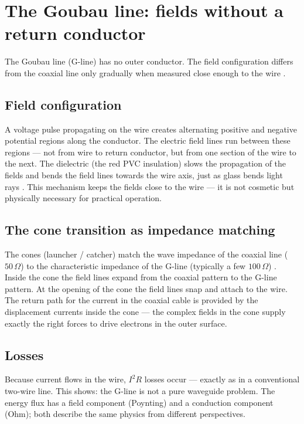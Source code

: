 \section{The Goubau line: fields without a return conductor}

The Goubau line (G-line) has no outer conductor. The field configuration
differs from the coaxial line only gradually when measured close enough to
the wire \EM.

\subsection*{Field configuration}

A voltage pulse propagating on the wire creates alternating positive and
negative potential regions along the conductor. The electric field lines
run between these regions --- not from wire to return conductor, but from
one section of the wire to the next. The dielectric (the red PVC insulation)
slows the propagation of the fields and bends the field lines towards the
wire axis, just as glass bends light rays \cite{Goubau1950,Harms1907}.
This mechanism keeps the fields close to the wire --- it is not cosmetic
but physically necessary for practical operation.

\subsection*{The cone transition as impedance matching}

The cones (launcher / catcher) match the wave impedance of the coaxial
line ($50\,\Omega$) to the characteristic impedance of the G-line
(typically a few $100\,\Omega$) \EM. Inside the cone the field lines
expand from the coaxial pattern to the G-line pattern. At the opening of
the cone the field lines snap and attach to the wire. The return path for
the current in the coaxial cable is provided by the displacement currents
inside the cone --- the complex fields in the cone supply exactly the right
forces to drive electrons in the outer surface.

\subsection*{Losses}

Because current flows in the wire, $I^2 R$ losses occur --- exactly as in
a conventional two-wire line. This shows: the G-line is not a pure
waveguide problem. The energy flux has a field component (Poynting) and a
conduction component (Ohm); both describe the same physics from different
perspectives.

